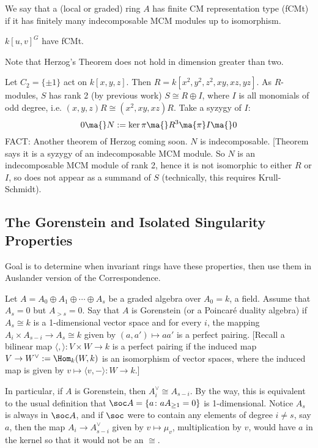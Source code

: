 \begin{dfn}
We say that a (local or graded) ring $A$ has finite CM representation type (fCMt) if it has finitely many indecomposable MCM modules up to isomorphism. 
\end{dfn}


\begin{cor}
$k[u,v]^G$ have fCMt. 
\end{cor}


Note that Herzog's Theorem does not hold in dimension greater than two. 

\begin{ex}
Let $C_2= \{\pm 1\}$ act on $k[x,y,z]$. Then $R= k[x^2,y^2,z^2,xy,xz,yz]$. As $R$-modules, $S$ has rank 2 (by previous work) $S \cong R \oplus I$, where $I$ is all monomials of odd degree, i.e. $(x,y,z)R \cong (x^2,xy,xz)R$. Take a syzygy of $I$: 
	\[
	0 \ma{} N:= \ker \pi \ma{} R^3 \ma{\pi} I \ma{} 0
	\]
FACT: Another theorem of Herzog coming soon. $N$ is indecomposable. [Theorem says it is a syzygy of an indecomposable MCM module. So $N$ is an indecomposable MCM module of rank 2, hence it is not isomorphic to either $R$ or $I$, so does not appear as a summand of $S$ (technically, this requires Krull-Schmidt). 
\end{ex}



\subsection{The Gorenstein and Isolated Singularity Properties}


Goal is to determine when invariant rings have these properties, then use them in Auslander version of the \mc Correspondence. 


\begin{dfn}[Gorenstein]
Let $A= A_0 \oplus A_1 \oplus \cdots \oplus A_s$ be a graded algebra over $A_0=k$, a field. Assume that $A_s=0$ but $A_{>s}=0$. Say that $A$ is Gorenstein (or a Poincar\'e duality algebra) if $A_s \cong k$ is a 1-dimensional vector space and for every $i$, the mapping $A_i \times A_{s-i} \to A_s \cong k$ given by $(a,a') \mapsto aa'$ is a perfect pairing. [Recall a bilinear map $\langle, \rangle: V \times W \to k$ is a perfect pairing if the induced map $V \to W^\vee:= \Hom_k(W,k)$ is an isomorphism of vector spaces, where the induced map is given by  $v \mapsto \langle v, - \rangle: W \to k$.] 
\end{dfn}


In particular, if $A$ is Gorenstein, then $A_i^\vee \cong A_{s-i}$. By the way, this is equivalent to the usual definition that $\soc A= \{a \colon a A_{\geq 1}=0 \}$ is 1-dimensional. Notice $A_s$ is always in $\soc A$, and if $\soc$ were to contain any elements of degree $i \neq s$, say $a$, then the map $A_i \to A_{s-i}^\vee$ given by $v \mapsto \mu_v$, multiplication by $v$, would have $a$ in the kernel so that it would not be an $\cong$. 



